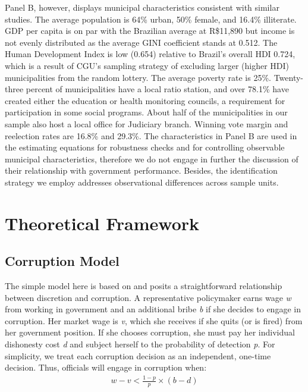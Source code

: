 \documentclass[11pt]{article}
\begin{document}
Panel B, however, displays municipal characteristics consistent with similar studies. The average population is 64\% urban, 50\% female, and 16.4\% illiterate. GDP per capita is on par with the Brazilian average at R\$11,890 but income is not evenly distributed as the average GINI coefficient stands at 0.512. The Human Development Index is low (0.654) relative to Brazil's overall HDI 0.724, which is a result of CGU's sampling strategy of excluding larger (higher HDI) municipalities from the random lottery. The average poverty rate is 25\%. Twenty-three percent of municipalities have a local ratio station, and over 78.1\% have created either the education or health monitoring councils, a requirement for participation in some social programs. About half of the municipalities in our sample also host a local office for Judiciary branch. Winning vote margin and reelection rates are 16.8\% and 29.3\%. The characteristics in Panel B are used in the estimating equations for robustness checks and for controlling observable municipal characteristics, therefore we do not engage in further the discussion of their relationship with government performance. Besides, the identification strategy we employ addresses observational differences across sample units.

\section{Theoretical Framework} \label{sec:theory}

\subsection{Corruption Model} \label{subsec:corruption}

The simple model here is based on \citet{OlkenCorruptionDevelopingCountries2012b} and posits a straightforward relationship between discretion and corruption. A representative policymaker earns wage \emph{w} from working in government and an additional bribe \emph{b} if she decides to engage in corruption. Her market wage is \emph{v}, which she receives if she quits (or is fired) from her government position. If she chooses corruption, she must pay her individual dishonesty cost \emph{d} and subject herself to the probability of detection \emph{p}. For simplicity, we treat each corruption decision as an independent, one-time decision. Thus, officials will engage in corruption when:
\begin{equation} \label{eq:simplemodel}
  \begin{split}
    w - v < \frac{1-p}{p}\times(b-d)
  \end{split}
\end{equation}
\end{document}
